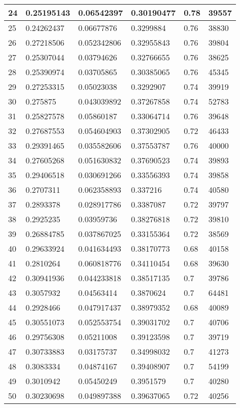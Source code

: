 \begin{longtable}{|l|l|l|l|l|l|}
24 & 0.25195143 & 0.06542397 & 0.30190477 & 0.78 & 39557 \\ \hline 
25 & 0.24262437 & 0.06677876 & 0.3299884 & 0.76 & 38830 \\ \hline 
26 & 0.27218506 & 0.052342806 & 0.32955843 & 0.76 & 39804 \\ \hline 
27 & 0.25307044 & 0.03794626 & 0.32766655 & 0.76 & 38625 \\ \hline 
28 & 0.25390974 & 0.03705865 & 0.30385065 & 0.76 & 45345 \\ \hline 
29 & 0.27253315 & 0.05023038 & 0.3292907 & 0.74 & 39919 \\ \hline 
30 & 0.275875 & 0.043039892 & 0.37267858 & 0.74 & 52783 \\ \hline 
31 & 0.25827578 & 0.05860187 & 0.33064714 & 0.76 & 39648 \\ \hline 
32 & 0.27687553 & 0.054604903 & 0.37302905 & 0.72 & 46433 \\ \hline 
33 & 0.29391465 & 0.035582606 & 0.37553787 & 0.76 & 40000 \\ \hline 
34 & 0.27605268 & 0.051630832 & 0.37690523 & 0.74 & 39893 \\ \hline 
35 & 0.29406518 & 0.030691266 & 0.33556393 & 0.74 & 39858 \\ \hline 
36 & 0.2707311 & 0.062358893 & 0.337216 & 0.74 & 40580 \\ \hline 
37 & 0.2893378 & 0.028917786 & 0.3387087 & 0.72 & 39797 \\ \hline 
38 & 0.2925235 & 0.03959736 & 0.38276818 & 0.72 & 39810 \\ \hline 
39 & 0.26884785 & 0.037867025 & 0.33155364 & 0.72 & 38569 \\ \hline 
40 & 0.29633924 & 0.041634493 & 0.38170773 & 0.68 & 40158 \\ \hline 
41 & 0.2810264 & 0.060818776 & 0.34110454 & 0.68 & 39630 \\ \hline 
42 & 0.30941936 & 0.044233818 & 0.38517135 & 0.7 & 39786 \\ \hline 
43 & 0.3057932 & 0.04563414 & 0.3870624 & 0.7 & 64481 \\ \hline 
44 & 0.2928466 & 0.047917437 & 0.38979352 & 0.68 & 40089 \\ \hline 
45 & 0.30551073 & 0.052553754 & 0.39031702 & 0.7 & 40706 \\ \hline 
46 & 0.29756308 & 0.05211008 & 0.39123598 & 0.7 & 39719 \\ \hline 
47 & 0.30733883 & 0.03175737 & 0.34998032 & 0.7 & 41273 \\ \hline 
48 & 0.3083334 & 0.04874167 & 0.39408907 & 0.7 & 54199 \\ \hline 
49 & 0.3010942 & 0.05450249 & 0.3951579 & 0.7 & 40280 \\ \hline 
50 & 0.30230698 & 0.049897388 & 0.39637065 & 0.72 & 40256 \\ \hline 
\end{longtable}